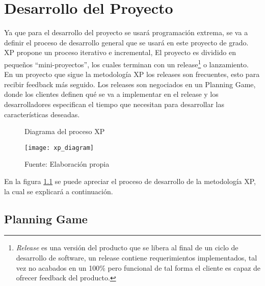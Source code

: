 \chapter{Desarrollo del Proyecto} %
\label{cha:desarrollo}

Ya que para el desarrollo del proyecto se usará programación extrema,
se va a definir el proceso de desarrollo general que se usará en este proyecto
de grado.\\


  XP propone un proceso iterativo e incremental, El proyecto es dividido en pequeños “mini-proyectos”, los cuales terminan con un release\footnote{\emph{Release} es una versión del producto que se libera al final de un ciclo de desarrollo de software, un release contiene requerimientos implementados, tal vez no acabados en un  100\% pero funcional de tal forma el cliente es capaz de ofrecer feedback del producto.} o lanzamiento.\\

En un proyecto que sigue la metodología XP los releases son frecuentes, esto para recibir feedback más seguido. Los releases son negociados en un Planning Game, donde los clientes definen qué se va a implementar en el release y los desarrolladores especifican el tiempo que necesitan para desarrollar las características deseadas.\\

\begin{figure}[H]
  \caption{Diagrama del proceso XP}
  \label{fig:xp_diagram}
  \begin{center}
    \texttt{[image: xp\_diagram]}
  \end{center}
  \caption*{Fuente: Elaboración propia}
\end{figure}

En la figura \ref{fig:xp_diagram} se puede apreciar el proceso de desarrollo de la metodología XP, la cual se explicará a continuación.\\

  \section{Planning Game}
  \label{sec:planning_game}

